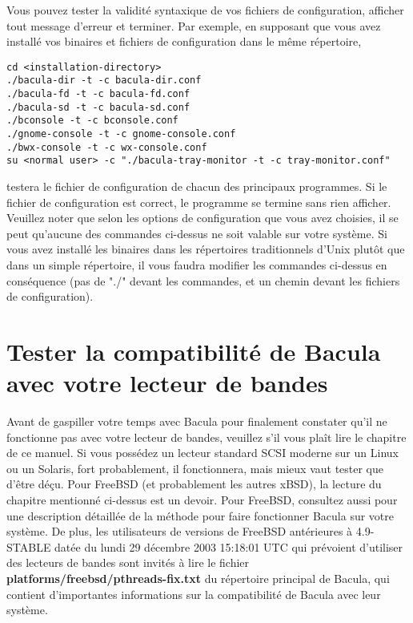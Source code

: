 {{{{{{{{{Vous pouvez tester la validit\'e syntaxique de vos fichiers de configuration,
afficher tout message d'erreur et terminer. Par exemple, en supposant que vous
avez install\'e vos binaires et fichiers de configuration dans le m\^eme
r\'epertoire, 

\footnotesize
\begin{verbatim}
cd <installation-directory>
./bacula-dir -t -c bacula-dir.conf
./bacula-fd -t -c bacula-fd.conf
./bacula-sd -t -c bacula-sd.conf
./bconsole -t -c bconsole.conf
./gnome-console -t -c gnome-console.conf
./bwx-console -t -c wx-console.conf
su <normal user> -c "./bacula-tray-monitor -t -c tray-monitor.conf"
\end{verbatim}
\normalsize

testera le fichier de configuration de chacun des principaux programmes. Si le
fichier de configuration est correct, le programme se termine
sans rien afficher. Veuillez noter que selon les options de configuration que
vous avez choisies, il se peut qu'aucune des commandes ci-dessus ne soit
valable sur votre syst\`eme. Si vous avez install\'e les binaires dans les
r\'epertoires traditionnels d'Unix plut\^ot que dans un simple r\'epertoire,
il vous faudra modifier les commandes ci-dessus en cons\'equence (pas de
"./" devant les commandes, et un chemin devant les fichiers de
configuration). 
\label{TapeTesting}

\section{Tester la compatibilit\'e de Bacula avec votre lecteur de bandes}

Avant de gaspiller votre temps avec Bacula pour finalement constater qu'il ne
fonctionne pas avec votre lecteur de bandes, veuillez s'il vous pla\^it lire le
chapitre 
de ce manuel. Si vous poss\'edez un lecteur standard SCSI moderne sur un Linux
ou un Solaris, fort probablement, il fonctionnera, mais mieux vaut tester que
d'\^etre d\'e\c{c}u. Pour FreeBSD (et probablement les autres xBSD), la
lecture du chapitre mentionn\'e ci-dessus est un devoir. Pour FreeBSD,
consultez aussi 
 pour une
description d\'etaill\'ee de la m\'ethode pour faire fonctionner Bacula sur
votre syst\`eme. De plus, les utilisateurs de versions de FreeBSD
ant\'erieures \`a 4.9-STABLE dat\'ee du lundi 29 d\'ecembre 2003 15:18:01 UTC
qui pr\'evoient d'utiliser des lecteurs de bandes sont invit\'es \`a lire le
fichier {\bf platforms/freebsd/pthreads-fix.txt} du r\'epertoire principal de
Bacula, qui contient d'importantes informations sur la compatibilit\'e de
Bacula avec leur syst\`eme. 
\label{notls}

}}}}}}}}}
